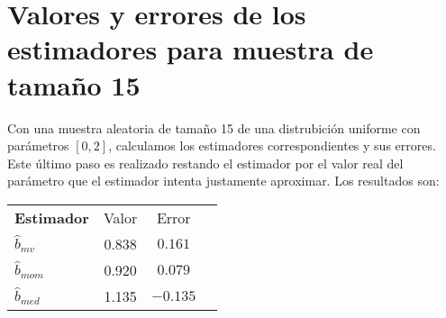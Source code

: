 \section{Valores y errores de los estimadores para muestra de tamaño 15}
Con una muestra aleatoria de tamaño 15 de una distrubición uniforme con parámetros $[0, 2]$, calculamos los estimadores correspondientes y sus errores. Este último paso es realizado restando el estimador por el valor real del parámetro que el estimador intenta justamente aproximar. Los resultados son:

\begin{table}[H]
	\centering
	\begin{tabular}{lccc}
		\textbf{Estimador} 	&	Valor 		& Error 	\\
		$\hat{b}_{mv}$  	&	0.838 		& $0.161$ 	\\
		$\hat{b}_{mom}$     &	0.920 		& $0.079$ 	\\
		$\hat{b}_{med}$  	&	1.135 		& $-0.135$
	\end{tabular}
\end{table}